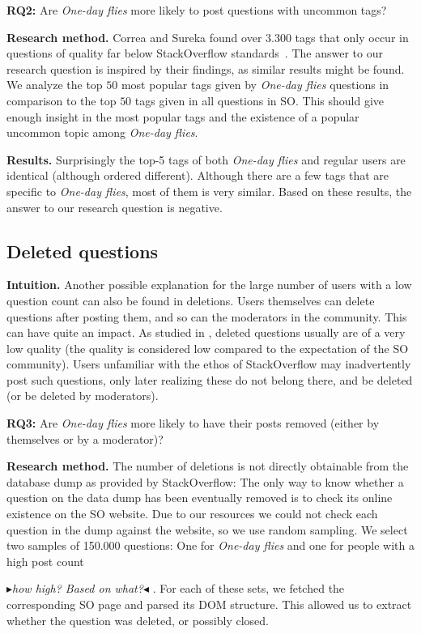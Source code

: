 \documentclass[conference]{IEEEtran}
\newcommand{\nb}[3]{
  \fcolorbox{black}{#2}{\bfseries\sffamily\scriptsize#1}
    {\sf\small$\blacktriangleright$\textit{#3}$\blacktriangleleft$}
}
\newcommand\AB[1]{\nb{alberto}{cyan}{#1}}
\newcommand\odf{\emph{One-day flies}\xspace}
\begin{document}
\textbf{RQ2:} Are \odf more likely to post questions with uncommon tags?
 
\textbf{Research method.} Correa and Sureka found over $3.300$ tags that only
occur in questions of quality far below StackOverflow
standards~\cite{correa2014chaff}. The answer to our research question is
inspired by their findings, as similar results might be found. We analyze the
top $50$ most popular tags given by \odf questions in comparison to the top
$50$ tags given in all questions in SO. This should give enough insight in the
most popular tags and the existence of a popular uncommon topic among \odf.

\textbf{Results.} Surprisingly the top-5 tags of both \odf and regular users
are identical (although ordered different). Although there are a few tags that
are specific to \odf, most of them is very similar. Based on these results, the
answer to our research question is negative. 

\subsection{Deleted questions}

\textbf{Intuition.} Another possible explanation for the large number of users with a low question
count can also be found in deletions. Users themselves can delete questions
after posting them, and so can the moderators in the community. This can have quite
an impact. As studied in \cite{correa2014chaff}, deleted questions usually are
of a very low quality (the quality is considered low compared to the
expectation of the SO community). Users unfamiliar with the ethos of
StackOverflow may inadvertently post such questions, only later realizing these
do not belong there, and be deleted (or be deleted by moderators). 
 
\textbf{RQ3:} Are \odf more likely to have their posts removed (either by themselves
or by a moderator)?
 
\textbf{Research method.} The number of deletions is not directly obtainable from the database dump as
provided by StackOverflow: The only way to know whether a question on the data
dump has been eventually removed is to check its online existence on the SO
website. Due to our resources we could not check each question in the dump
against the website, so we use random sampling. We select two samples of
150.000 questions: One for \odf and one for people with a high post count
\AB{how high? Based on what?}. For each of these sets, we fetched the
corresponding SO page and parsed its DOM structure. This allowed us to extract whether the
question was deleted, or possibly closed.
\end{document}
